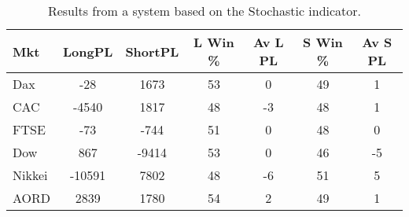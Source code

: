 \begin{table}[ht]
\centering
\caption[Results from a system based on the Stochastic indicator]{Results from a system based on the Stochastic indicator.} 
\label{tab:stoch_results}
\begin{tabular}{lcccccc}
  \toprule Mkt & LongPL & ShortPL & L Win \% & Av L PL & S Win \% & Av S PL \\ 
  \midrule Dax & -28 & 1673 & 53 & 0 & 49 & 1 \\ 
  CAC & -4540 & 1817 & 48 & -3 & 48 & 1 \\ 
  FTSE & -73 & -744 & 51 & 0 & 48 & 0 \\ 
  Dow & 867 & -9414 & 53 & 0 & 46 & -5 \\ 
  Nikkei & -10591 & 7802 & 48 & -6 & 51 & 5 \\ 
  AORD & 2839 & 1780 & 54 & 2 & 49 & 1 \\ 
   \bottomrule \end{tabular}
\end{table}
